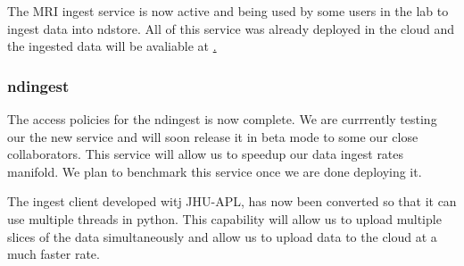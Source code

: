 \documentclass[simplex.tex]{subfiles}
\begin{document}
The MRI ingest service is now active and being used by some users in the lab to ingest data into ndstore. All of this service was already deployed in the cloud and the ingested data will be avaliable at \href{http://mri.neurodata.io}.


\subsubsection{ndingest}

The access policies for the ndingest is now complete. We are currrently testing our the new service and will soon release it in beta mode to some our close collaborators. This service will allow us to speedup our data ingest rates manifold. We plan to benchmark this service once we are done deploying it.

The ingest client developed witj JHU-APL, has now been converted so that it can use multiple threads in python. This capability will allow us to upload multiple slices of the data simultaneously and allow us to upload data to the cloud at a much faster rate. 
\end{document}
